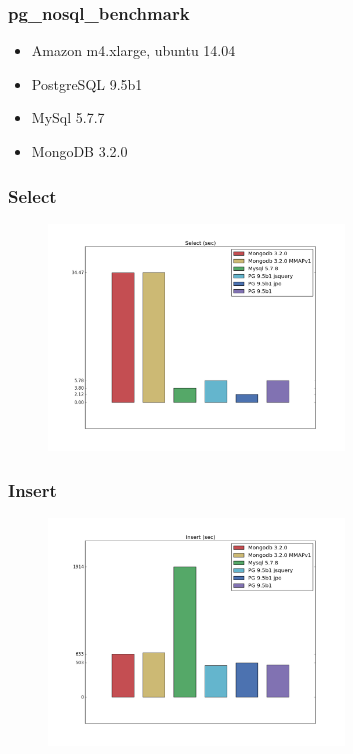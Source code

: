 \documentclass[14pt, compress, aspectratio=169]{beamer}
\begin{document}
\begin{frame}[fragile]
    \frametitle{pg\_nosql\_benchmark}
    \begin{itemize}[label={\MVRightarrow}]
        \item Amazon m4.xlarge, ubuntu 14.04
        \item PostgreSQL 9.5b1
        \item MySql 5.7.7
        \item MongoDB 3.2.0
    \end{itemize}

\end{frame}

\begin{frame}[fragile]
    \frametitle{Select}
    \vspace{-35pt}
    \begin{figure}
        \includegraphics[width=0.7\textwidth,center]{select.png}
    \end{figure}
\end{frame}

\begin{frame}[fragile]
    \frametitle{Insert}
    \vspace{-35pt}
    \begin{figure}
        \includegraphics[width=0.7\textwidth,center]{insert.png}
    \end{figure}
\end{frame}
\end{document}
